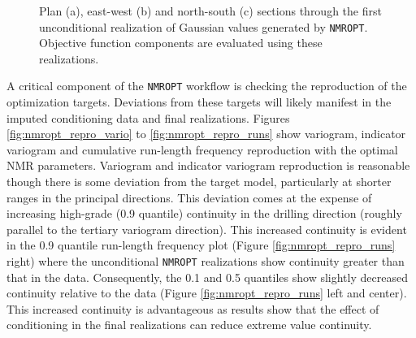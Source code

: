\begin{figure}
    \centering
    \tabskip=0pt
    \caption{Plan (a), east-west (b) and north-south (c) sections through the first unconditional realization of Gaussian values generated by \texttt{NMROPT}. Objective function components are evaluated using these realizations. }
    \label{fig:nmropt_uncond_reals}
\end{figure}

A critical component of the \texttt{NMROPT} workflow is checking the reproduction of the optimization targets. Deviations from these targets will likely manifest in the imputed conditioning data and final realizations. Figures \ref{fig:nmropt_repro_vario} to \ref{fig:nmropt_repro_runs} show variogram, indicator variogram and cumulative run-length frequency reproduction with the optimal \gls{NMR} parameters. Variogram and indicator variogram reproduction is reasonable though there is some deviation from the target model, particularly at shorter ranges in the principal directions. This deviation comes at the expense of increasing high-grade (0.9 quantile) continuity in the drilling direction (roughly parallel to the tertiary variogram direction). This increased continuity is evident in the 0.9 quantile run-length frequency plot (Figure \ref{fig:nmropt_repro_runs} right) where the unconditional \texttt{NMROPT} realizations show continuity greater than that in the data. Consequently, the 0.1 and 0.5 quantiles show slightly decreased continuity relative to the data (Figure \ref{fig:nmropt_repro_runs} left and center). This increased continuity is advantageous as results show that the effect of conditioning in the final realizations can reduce extreme value continuity.


